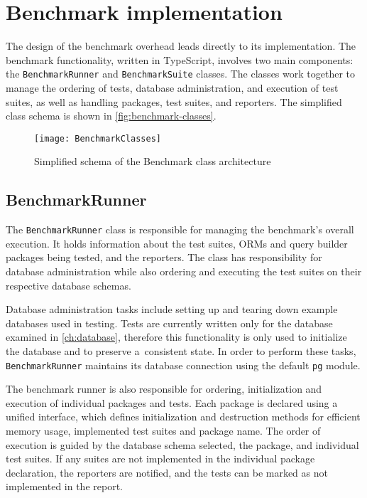 \chapter{Benchmark implementation}

The design of the benchmark overhead leads directly to its implementation. The
benchmark functionality, written in TypeScript, involves two main components:
the \texttt{BenchmarkRunner} and \texttt{BenchmarkSuite} classes. The classes
work together to manage the ordering of tests, database administration, and
execution of test suites, as well as handling packages, test suites, and
reporters. The simplified class schema is shown in \autoref{fig:benchmark-classes}.

\begin{figure}[hp]
    \caption{Simplified schema of the Benchmark class architecture}
    \centering
    \label{fig:benchmark-classes}
    \texttt{[image: BenchmarkClasses]}
\end{figure}

\section{BenchmarkRunner}

The \texttt{BenchmarkRunner} class is responsible for managing the benchmark’s
overall execution. It holds information about the test suites, ORMs and query
builder packages being tested, and the reporters. The class has responsibility
for database administration while also ordering and executing the test suites on
their respective database schemas.

Database administration tasks include setting up and tearing down example
databases used in testing. Tests are currently written only for the database
examined in \autoref{ch:database}, therefore this functionality is only used to
initialize the database and to preserve a~consistent state. In order to perform
these tasks, \texttt{BenchmarkRunner} maintains its database connection using
the default \texttt{pg} module.

The benchmark runner is also responsible for ordering, initialization and
execution of individual packages and tests. Each package is declared using a
unified interface, which defines initialization and destruction methods for
efficient memory usage, implemented test suites and package name. The order of
execution is guided by the database schema selected, the package, and
individual test suites. If any suites are not implemented in the individual
package declaration, the reporters are notified, and the tests can be marked as
not implemented in the report.

